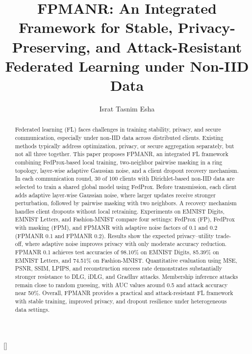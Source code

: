 \documentclass[a4paper,fleqn]{cas-dc}
\begin{document}
\let\WriteBookmarks\relax
\def\floatpagepagefraction{1}
\def\textpagefraction{.001}


\title[mode = title]{FPMANR: An Integrated Framework for Stable, Privacy-Preserving, and Attack-Resistant Federated Learning under Non-IID Data}

\author[1]{Israt Tasnim Esha}[]
\cormark[1]



\begin{abstract}
Federated learning (FL) faces challenges in training stability, privacy, and secure communication, especially under non-IID data across distributed clients. Existing methods typically address optimization, privacy, or secure aggregation separately, but not all three together. This paper proposes FPMANR, an integrated FL framework combining FedProx-based local training, two-neighbor pairwise masking in a ring topology, layer-wise adaptive Gaussian noise, and a client dropout recovery mechanism. In each communication round, 30 of 100 clients with Dirichlet-based non-IID data are selected to train a shared global model using FedProx. Before transmission, each client adds adaptive layer-wise Gaussian noise, where larger updates receive stronger perturbation, followed by pairwise masking with two neighbors. A recovery mechanism handles client dropouts without local retraining. Experiments on EMNIST Digits, EMNIST Letters, and Fashion-MNIST compare four settings: FedProx (FP), FedProx with masking (FPM), and FPMANR with adaptive noise factors of 0.1 and 0.2 (FPMANR 0.1 and FPMANR 0.2). Results show the expected privacy--utility trade-off, where adaptive noise improves privacy with only moderate accuracy reduction. FPMANR 0.1 achieves test accuracies of 98.10\% on EMNIST Digits, 85.39\% on EMNIST Letters, and 74.51\% on Fashion-MNIST. Quantitative evaluation using MSE, PSNR, SSIM, LPIPS, and reconstruction success rate demonstrates substantially stronger resistance to DLG, iDLG, and GradInv attacks. Membership inference attacks remain close to random guessing, with AUC values around 0.5 and attack accuracy near 50\%. Overall, FPMANR provides a practical and attack-resistant FL framework with stable training, improved privacy, and dropout resilience under heterogeneous data settings.
\end{abstract}
\end{document}
